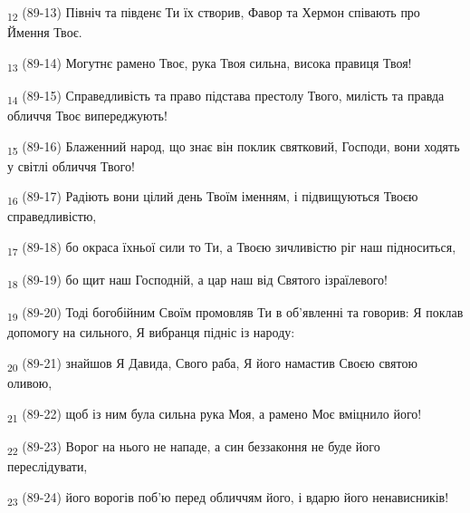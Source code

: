 \begin{tcolorbox}
\textsubscript{12} (89-13) Північ та південє Ти їх створив, Фавор та Хермон співають про Ймення Твоє.
\end{tcolorbox}
\begin{tcolorbox}
\textsubscript{13} (89-14) Могутнє рамено Твоє, рука Твоя сильна, висока правиця Твоя!
\end{tcolorbox}
\begin{tcolorbox}
\textsubscript{14} (89-15) Справедливість та право підстава престолу Твого, милість та правда обличчя Твоє випереджують!
\end{tcolorbox}
\begin{tcolorbox}
\textsubscript{15} (89-16) Блаженний народ, що знає він поклик святковий, Господи, вони ходять у світлі обличчя Твого!
\end{tcolorbox}
\begin{tcolorbox}
\textsubscript{16} (89-17) Радіють вони цілий день Твоїм іменням, і підвищуються Твоєю справедливістю,
\end{tcolorbox}
\begin{tcolorbox}
\textsubscript{17} (89-18) бо окраса їхньої сили то Ти, а Твоєю зичливістю ріг наш підноситься,
\end{tcolorbox}
\begin{tcolorbox}
\textsubscript{18} (89-19) бо щит наш Господній, а цар наш від Святого ізраїлевого!
\end{tcolorbox}
\begin{tcolorbox}
\textsubscript{19} (89-20) Тоді богобійним Своїм промовляв Ти в об'явленні та говорив: Я поклав допомогу на сильного, Я вибранця підніс із народу:
\end{tcolorbox}
\begin{tcolorbox}
\textsubscript{20} (89-21) знайшов Я Давида, Свого раба, Я його намастив Своєю святою оливою,
\end{tcolorbox}
\begin{tcolorbox}
\textsubscript{21} (89-22) щоб із ним була сильна рука Моя, а рамено Моє вміцнило його!
\end{tcolorbox}
\begin{tcolorbox}
\textsubscript{22} (89-23) Ворог на нього не нападе, а син беззаконня не буде його переслідувати,
\end{tcolorbox}
\begin{tcolorbox}
\textsubscript{23} (89-24) його ворогів поб'ю перед обличчям його, і вдарю його ненависників!
\end{tcolorbox}
